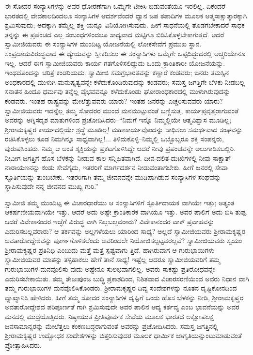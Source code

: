 ಈ ಸೋದರ ಸಂನ್ಯಾಸಿಗಳನ್ನು ಅವರ ಧೋರಣೆಗಾಗಿ ಒಮ್ಮೆಗೇ ಟೀಕಿಸಿ ಬಿಡುವಂತೆಯೂ ಇರಲಿಲ್ಲ. ಏಕೆಂದರೆ ಭಾರತದಲ್ಲಿ ವೇದಕಾಲದಿಂದಲೂ ಸಂನ್ಯಾಸಿಗಳ ಆದರ್ಶವೆಂದರೆ ಧ್ಯಾನ ಜಪ ತಪಾದಿಗಳ ಮೂಲಕ ಆತ್ಮಸಾಕ್ಷಾತ್ಕಾರಕ್ಕಾಗಿ ಶ್ರಮಿಸುವುದು; ಅದಕ್ಕಾಗಿ ತಮ್ಮೆಲ್ಲ ಶಕ್ತಿ ಯನ್ನೂ ವಿನಿಯೋಗಿಸುವುದು. ಹೀಗೆ ಸಾಧನೆಯಲ್ಲಿ ತೊಡಗಬೇಕಾದರೆ ಸಾಧಕ ತನ್ನನ್ನು ಈ ಪ್ರಪಂಚದ ಎಲ್ಲ ಸಂಬಂಧಗಳಿಂದಲೂ ಸಾಧ್ಯವಾದ ಮಟ್ಟಿಗೂ ಬಿಡಿಸಿಕೊಳ್ಳಬೇಕಾಗುತ್ತದೆ. ಆದರೆ ಸ್ವಾಮೀಜಿಯವರು ಈ ಸಂನ್ಯಾಸಿಗಳ ಮುಂದಿಟ್ಟ ಯೋಜನೆಯಲ್ಲಿ ಲೋಕಸೇವೆಗೆ ಪ್ರಮುಖ ಸ್ಥಾನ. ಸಂಪ್ರದಾಯವಿರುದ್ಧವಾದ ಈ ಧ್ಯೇಯವನ್ನು ಸ್ವೀಕರಿಸಲು ಈ ಸಂನ್ಯಾಸಿಗಳು ಒಮ್ಮೆಗೇ ಒಪ್ಪದಿದ್ದುದರಲ್ಲಿ ಅಚ್ಚರಿಯೇನೂ ಇಲ್ಲ. ಆದರೆ ಈಗ ಸ್ವಾಮೀಜಿಯವರು ಕಾರ್ಯ ಗತಗೊಳಿಸಲಿದ್ದುದು ಒಂದು ಕ್ರಾಂತಿಕಾರೀ ಯೋಜನೆಯನ್ನು. ಇಂಥದೊಂದನ್ನು ಚರಿತ್ರೆ ಕಂಡರಿಯದು. ಸ್ವಾಮೀಜಿ ಸಮಗ್ರಭಾರತವನ್ನು ಕಣ್ಣಾರೆ ಕಂಡವರು; ಜನರು ತಮಸ್ಸಿನ ಅಂಧಕಾರದಲ್ಲಿ ಮುಳುಗಿ ಮನುಷ್ಯತ್ವವನ್ನೇ ಕಳೆದುಕೊಂಡಿರುವುದನ್ನು ಕಂಡವರು; ಸಮಸ್ತ ಜಗತ್ತಿಗೇ ಬೆಳಕು ನೀಡಬಲ್ಲ ಸನಾತನ ಹಿಂದೂ ಧರ್ಮವು ತನ್ನೆಲ್ಲ ವೈಭವವನ್ನೂ ಕಳೆದುಕೊಂಡು ಘೋರಾಂಧಕಾರದಲ್ಲಿ ಮುಳುಗಿರುವುದನ್ನು ಕಂಡವರು. ಇಂತಹ ರಾಷ್ಟ್ರವನ್ನು ಮೇಲೆತ್ತುವವರು ಯಾರು? ಇಂತಹ ಜನರನ್ನು ಎಚ್ಚರಿಸುವವರು ಯಾರು? ಸ್ವಾಮೀಜಿಯವರು ಇದನ್ನೆಲ್ಲ ತಮ್ಮ ಸೋದರರ ಮುಂದೆ ಮನಮುಟ್ಟುವಂತೆ ಬಣ್ಣಿಸುತ್ತ, ಕಾರ್ಯಪ್ರವೃತ್ತರಾಗುವಂತೆ ಅವರನ್ನು ಅಗ್ನಿಸದೃಶ ಮಾತುಗಳಿಂದ ಪ್ರಚೋದಿಸಿದರು–“ನಿಮಗೆ ಇನ್ನೂ ನಿಮ್ಮಲ್ಲಿಯೇ ಆತ್ಮವಿಶ್ವಾಸ ಮೂಡಿಲ್ಲ; ಶ್ರೀರಾಮಕೃಷ್ಣರ ಕಾರ್ಯದಲ್ಲಿಯೇ ಶ್ರದ್ಧೆ ಮೂಡಿಲ್ಲ! ಮಹಾಕಾರ್ಯವೊಂದನ್ನು ಸಾಧಿಸಲು ಸಮರ್ಥವಾದ ಸಂಘವನ್ನು ರಚಿಸಿಕೊಳ್ಳಲು ಕೂಡ ನಿಮಗಿನ್ನೂ ಸಾಧ್ಯವಾಗಿಲ್ಲ!... ತಿಳಿದುಕೊಳ್ಳಿ–ನಿಮ್ಮಲ್ಲಿ ಒಬ್ಬೊಬ್ಬರೂ ಶಕ್ತಿ ಸಂಪನ್ನರು, ಪುರುಷಸಿಂಹರು. ನಿಮ್ಮ ಆ ಅಂತ ಶ್ಶಕ್ತಿಯನ್ನು ಪ್ರಕಟಗೊಳಿಸಿದ್ದೇ ಆದರೆ ನೀವು ಪ್ರಪಂಚವನ್ನೇ ಅಲುಗಾಡಿಸಬಲ್ಲಿರಿ. ನೀವೀಗ ಜಗತ್ತಿಗೆ ಹೊಸ ಬೆಳಕನ್ನು ನೀಡುವ ಕಾಲ ಸನ್ನಿಹಿತವಾಗಿದೆ. ದೀನ-ದಲಿತ-ದುಃಖಿಗಳಲ್ಲಿ ನೀವು ಸಾಕ್ಷಾತ್ ನಾರಾಯಣನನ್ನು ಕಂಡು ಸೇವೆಗೈದು, ಇತರರಿಗೆ ಮಾರ್ಗದರ್ಶನ ನೀಡುವಂತಾಗಬೇಕು. ಹೀಗೆ ಜನರಲ್ಲಿ ಸೇವಾ ಸ್ಫೂರ್ತಿಯನ್ನು ತುಂಬಬೇಕು. ಇತರರಿಗಾಗಿ ತಮ್ಮ ಜೀವನವನ್ನೇ ಮುಡಿಪಾಗಿಡುವ ಸಂನ್ಯಾಸಿಗಳ ಸಂಘವನ್ನು ಸ್ಥಾಪಿಸುವುದೇ ನನ್ನ ಜೀವನದ ಮುಖ್ಯ ಗುರಿ.”

ಸ್ವಾಮೀಜಿ ತಮ್ಮ ಮುಂದಿಟ್ಟ ಈ ವಿಚಾರಧಾರೆಯು ಆ ಸಂನ್ಯಾಸಿಗಳಿಗೆ ಸ್ಫೂರ್ತಿದಾಯಕ ವಾಗಿಯೇ ಇತ್ತು; ಅತ್ಯಂತ ಆಕರ್ಷಣೀಯವಾಗಿಯೇ ಇತ್ತು. ಆದರೆ ಅದು ಅಷ್ಟೇ ಕ್ರಾಂತಿಕಾರಕ ವಾಗಿಯೂ ಇತ್ತು. ಅವರ ಪಾಲಿಗೆ ಅದು ಬಿಸಿ ತುಪ್ಪ. ಆದರೆ ವಿವೇಕಾನಂದರ ಇಚ್ಛೆಗೆ ವಿರುದ್ಧ ವಾಗಿ ನಿಲ್ಲಬಲ್ಲವರಾರು? ವಿವೇಕಾನಂದರ ವಾಕ್ ಪ್ರವಾಹವನ್ನು ಎದುರಿಸಬಲ್ಲವರಾರು? ಆ ತರ್ಕವನ್ನು ಅಲ್ಲಗಳೆಯಲು ಯಾರಿಂದ ಸಾಧ್ಯ? ಅಲ್ಲದೆ ಸ್ವಾಮೀಜಿಯವರು ಶ್ರೀರಾಮಕೃಷ್ಣರ ಅವತಾರೋದ್ದೇಶವನ್ನು ಪೂರ್ಣಗೊಳಿಸಲೆಂದು ಅವರಿಂದಲೇ ನಿಯೋಜಿಸಲ್ಪಟ್ಟವರಲ್ಲವೆ? ಸ್ವಾಮೀಜಿಯವರು ಸ್ವಯಂ ಶ್ರೀರಾಮಕೃಷ್ಣರ ಪ್ರತಿನಿಧಿ ಎಂಬುದು ಮತ್ತೆ ಮತ್ತೆ ಸ್ಪಷ್ಟವಾಗು ತ್ತಿದೆ. ಹಾಗಿರುವಾಗ ಆ ಗುರುಭಾಯಿಗಳು ಸ್ವಾಮೀಜಿಯವರ ಮಾತನ್ನು ತಳ್ಳಿಹಾಕಲು ಹೇಗೆ ತಾನೆ ಸಾಧ್ಯ! ಇಷ್ಟೆಲ್ಲ ಆದರೂ ಸ್ವಾಮೀಜಿಯವರಿಗೆ ತಮ್ಮ ಗುರುಭಾಯಿಗಳ ಮನವೊಲಿಸು ವುದು ಅಷ್ಟೇನೂ ಸುಲಭವಾಗಲಿಲ್ಲ. ಅವರು ಸಾಕಷ್ಟು ಪ್ರತಿರೋಧವನ್ನೇ ಎದುರಿಸಬೇಕಾಯಿತು. ತಮ್ಮ ತೇಜಃಪುಂಜ ಬುದ್ಧಿ ಪ್ರಕಾಶದಿಂದ, ನಿಶಿತವಾದ ವಿಚಾರಸರಣಿಯಿಂದ ಅವರು ನಿಧಾನ ವಾಗಿ ತಮ್ಮ ಗುರುಭಾಯಿಗಳ ಮನವೊಲಿಸಿಕೊಂಡರು. ಶ್ರೀರಾಮಕೃಷ್ಣರ ದಿವ್ಯ ಸಂದೇಶಗಳನ್ನು ನೂತನ ದೃಷ್ಟಿಕೋನದಿಂದ ವ್ಯಾಖ್ಯಾನಿಸಿ ಹೇಳಿದರು. ಹೀಗೆ ತಮ್ಮ ಸೋದರ ಸಂನ್ಯಾಸಿಗಳ ದೃಷ್ಟಿಗೆ ಒಂದು ಹೊಸ ಬೆಳಕನ್ನು ನೀಡಿ, ಶ್ರೀರಾಮಕೃಷ್ಣರ ಅವತಾರೋದ್ದೇಶದ ಪರಿಪೂರ್ಣತೆ ಗಾಗಿ ಶ್ರಮಿಸುವುದೇ ಅವರ ಪಾಲಿನ ಆದ್ಯ ಕರ್ತವ್ಯ ಎಂಬ ಭಾವನೆಯನ್ನು ಅವರ ಮನದಲ್ಲಿ ಮುದ್ರೆಯೊತ್ತಿದರು. ನಿಷ್ಠಾಯುತ ಪ್ರೀತಿಪೂರ್ವಕ ಸೇವೆಯ ಮೂಲಕ ಭಾರತದ ಲಕ್ಷೋಪಲಕ್ಷ ಜನಸಾಮಾನ್ಯರನ್ನು ಮೇಲೆತ್ತಲು ಕಂಕಣಬದ್ಧರಾಗುವಂತೆ ಅವರನ್ನು ಪ್ರಚೋದಿಸಿದರು. ಸಮಸ್ತ ಜಗತ್ತಿನಲ್ಲಿ ಶ್ರೀರಾಮಕೃಷ್ಣರ ಉದ್ಬೋಧಕ ಸಂದೇಶಗಳನ್ನು ಬಿತ್ತರಿಸುವುದರ ಮೂಲಕ ಧಾರ್ಮಿಕ ಜಾಗೃತಿಯನ್ನುಂಟುಮಾಡುವಂತೆ ಪ್ರೋತ್ಸಾಹಿಸಿದರು.

